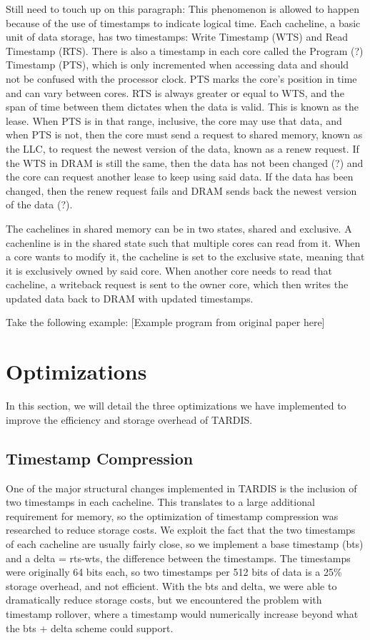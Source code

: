 \documentclass[12pt]{article}
\begin{document}
Still need to touch up on this paragraph: This phenomenon is allowed to happen because of the use of timestamps to indicate logical time. Each cacheline, a basic unit of data storage, has two timestamps: Write Timestamp (WTS) and Read Timestamp (RTS). There is also a timestamp in each core called the Program (?) Timestamp (PTS), which is only incremented when accessing data and should not be confused with the processor clock. PTS marks the core’s position in time and can vary between cores. RTS is always greater or equal to WTS, and the span of time between them dictates when the data is valid. This is known as the lease. When PTS is in that range, inclusive, the core may use that data, and when PTS is not, then the core must send a request to shared memory, known as the LLC, to request the newest version of the data, known as a renew request. If the WTS in DRAM is still the same, then the data has not been changed (?) and the core can request another lease to keep using said data. If the data has been changed, then the renew request fails and DRAM sends back the newest version of the data (?).

The cachelines in shared memory can be in two states, shared and exclusive. A cachenline is in the shared state such that multiple cores can read from it. When a core wants to modify it, the cacheline is set to the exclusive state, meaning that it is exclusively owned by said core. When another core needs to read that cacheline, a writeback request is sent to the owner core, which then writes the updated data back to DRAM with updated timestamps.

Take the following example:
[Example program from original paper here]

\section{Optimizations}

In this section, we will detail the three optimizations we  have implemented to improve the efficiency and storage overhead of TARDIS.

\subsection{Timestamp Compression}

One of the major structural changes implemented in TARDIS is the inclusion of two timestamps in each cacheline. This translates to a large additional requirement for memory, so the optimization of timestamp compression was researched to reduce storage costs. We exploit the fact that the two timestamps of each cacheline are usually fairly close, so we implement a base timestamp (bts) and a delta = rts-wts, the difference between the timestamps. The timestamps were originally 64 bits each, so two timestamps per 512 bits of data is a 25\% storage overhead, and not efficient.  With the bts and delta, we were able to dramatically reduce storage costs, but we encountered the problem with timestamp rollover, where a timestamp would numerically increase beyond what the bts + delta scheme could support.
\end{document}
